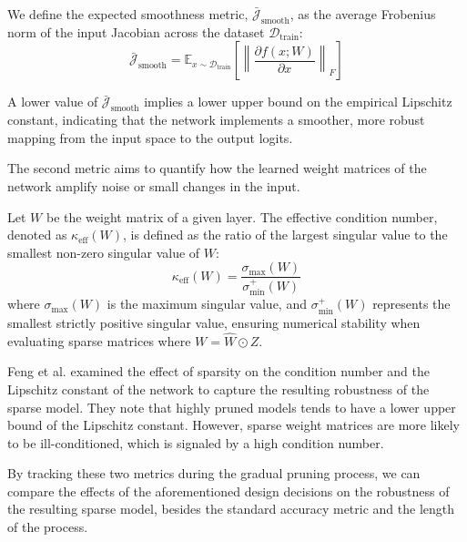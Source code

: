 We define the expected smoothness metric, $\bar{\mathcal{J}}_{\mathrm{smooth}}$, as the average Frobenius norm of the input Jacobian across the dataset $\mathcal{D}_{\mathrm{train}}$:
\begin{equation}
    \bar{\mathcal{J}}_{\mathrm{smooth}} = \mathbb{E}_{x \sim \mathcal{D}_{\mathrm{train}}} \left[ \left\| \frac{\partial f(x; W)}{\partial x} \right\|_F \right]
\label{eq:jacobian_norm}
\end{equation}

A lower value of $\bar{\mathcal{J}}_{\mathrm{smooth}}$ implies a lower upper bound on the empirical Lipschitz constant, indicating that the network implements
a smoother, more robust mapping from the input space to the output logits.

The second metric aims to quantify how the learned weight matrices of the network amplify noise or small changes in the input.

Let $W$ be the weight matrix of a given layer. The effective condition number, denoted as $\kappa_{\mathrm{eff}}(W)$, is defined as the ratio of the
largest singular value to the smallest non-zero singular value of $W$:
\begin{equation}
    \kappa_{\mathrm{eff}}(W) = \frac{\sigma_{\max}(W)}{\sigma_{\min}^{+}(W)}
\label{eq:conditionnumber}
\end{equation}
where $\sigma_{\max}(W)$ is the maximum singular value, and $\sigma_{\min}^{+}(W)$ represents the smallest strictly positive singular value,
ensuring numerical stability when evaluating sparse matrices where $W = \hat{W} \odot Z$.

Feng et al. \cite{lipschitz_condition_number} examined the effect of sparsity on the condition number and the Lipschitz constant of the network to capture
the resulting robustness of the sparse model. They note that highly pruned models tends to have a lower upper bound of the Lipschitz constant. However, sparse
weight matrices are more likely to be ill-conditioned, which is signaled by a high condition number.

By tracking these two metrics during the gradual pruning process, we can compare the effects of the aforementioned design decisions
on the robustness of the resulting sparse model, besides the standard accuracy metric and the length of the process.


